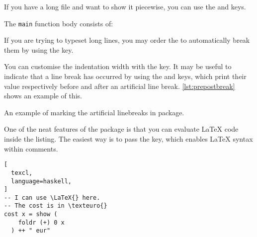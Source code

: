 If you have a long file and want to show it piecewise, you can use the
 and  keys.
\begin{example}[examplewidth=0.6\linewidth]
The \lstinline|main|
function body
consists of:

\end{example}

If you are trying to typeset long lines, you may order the  to
automatically break them by using the  key.
\begin{example}[examplewidth=0.6\linewidth]

\end{example}
You can customise the indentation width with the  key. It
may be useful to indicate that a line break has occurred by using the
 and  keys, which print their value
respectively before and after an artificial line break.
\autoref{lst:prepostbreak} shows an example of this.
\begin{listing}
  \begin{example}[examplewidth=0.6\linewidth, vertical_mode]

\end{example}
  \caption{An example of marking the artificial linebreaks in 
    package.}\label{lst:prepostbreak}
\end{listing}

One of the neat features of the  package is that you can evaluate
\LaTeX{} code inside the listing. The easiest way is to pass the
 key, which enables \LaTeX{} syntax within comments.
\begin{example}
\begin{lstlisting}[
  texcl,
  language=haskell,
]
-- I can use \LaTeX{} here.
-- The cost is in \texteuro{}
cost x = show (
    foldr (+) 0 x
  ) ++ " eur"
\end{lstlisting}
\end{example}

